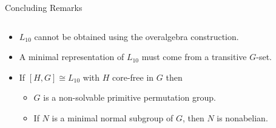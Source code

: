 \documentclass[xcolor=dvipsnames,9pt]{beamer}
\newcommand{\<}{\langle}	     %
\renewcommand{\>}{\rangle}	     %
\begin{document}

\begin{frame}[fragile,label=Conclusion,shrink=5]{Concluding Remarks}
  \begin{columns}
    \begin{column}{0.7\textwidth}
      \begin{itemize}
      \item  $L_{10}$ cannot be obtained using the overalgebra construction.
        \vskip3mm
      \item<2-> A minimal representation of $L_{10}$ must come from a transitive $G$-set.
        \vskip3mm
      \item<3-> If $[H,G]\cong L_{10}$ with $H$ core-free in $G$ then
        \vskip2mm
        \begin{itemize}
        \item $G$ is a non-solvable primitive permutation group.
          \vskip2mm
        \item If $N$ is a minimal normal subgroup of $G$, then $N$ is nonabelian.
        \end{itemize}
      \end{itemize}
    \end{column}
    \begin{column}{0.2\textwidth}
      \begin{center}
      \end{center}
\vskip5mm 
    \end{column}
  \end{columns}
\end{frame}
\end{document}
